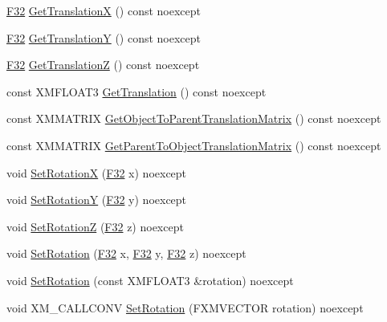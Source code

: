 \begin{DoxyCompactItemize}
\hyperlink{namespacemage_aa97e833b45f06d60a0a9c4fc22ae02c0}{F32} \hyperlink{structmage_1_1_transform_a90b2c059a45964bf4de816a4b7e6c55c}{Get\+TranslationX} () const noexcept
\item 
\hyperlink{namespacemage_aa97e833b45f06d60a0a9c4fc22ae02c0}{F32} \hyperlink{structmage_1_1_transform_a3a806edeeca4db92bdfa4d401ba17cb4}{Get\+TranslationY} () const noexcept
\item 
\hyperlink{namespacemage_aa97e833b45f06d60a0a9c4fc22ae02c0}{F32} \hyperlink{structmage_1_1_transform_a2899159e8e953026bf8b6863c65f454f}{Get\+TranslationZ} () const noexcept
\item 
const X\+M\+F\+L\+O\+A\+T3 \hyperlink{structmage_1_1_transform_af034983b5df429b31a3229270cc0b00b}{Get\+Translation} () const noexcept
\item 
const X\+M\+M\+A\+T\+R\+IX \hyperlink{structmage_1_1_transform_a7f9b6ae60fde68f06e3e57e2180af89c}{Get\+Object\+To\+Parent\+Translation\+Matrix} () const noexcept
\item 
const X\+M\+M\+A\+T\+R\+IX \hyperlink{structmage_1_1_transform_abc1bf609a4fc988ca8299ac4c67e4b25}{Get\+Parent\+To\+Object\+Translation\+Matrix} () const noexcept
\item 
void \hyperlink{structmage_1_1_transform_ac626eec777b86b0a1fc946703c962eda}{Set\+RotationX} (\hyperlink{namespacemage_aa97e833b45f06d60a0a9c4fc22ae02c0}{F32} x) noexcept
\item 
void \hyperlink{structmage_1_1_transform_aaf2754a227e2cf416960a92f7e4c5dc7}{Set\+RotationY} (\hyperlink{namespacemage_aa97e833b45f06d60a0a9c4fc22ae02c0}{F32} y) noexcept
\item 
void \hyperlink{structmage_1_1_transform_aca5e1d7c83e91f9c36be98c4a4a2163b}{Set\+RotationZ} (\hyperlink{namespacemage_aa97e833b45f06d60a0a9c4fc22ae02c0}{F32} z) noexcept
\item 
void \hyperlink{structmage_1_1_transform_ad4c49c5298d68f3945698ba88e461145}{Set\+Rotation} (\hyperlink{namespacemage_aa97e833b45f06d60a0a9c4fc22ae02c0}{F32} x, \hyperlink{namespacemage_aa97e833b45f06d60a0a9c4fc22ae02c0}{F32} y, \hyperlink{namespacemage_aa97e833b45f06d60a0a9c4fc22ae02c0}{F32} z) noexcept
\item 
void \hyperlink{structmage_1_1_transform_a7487b052a7c4ba8d1df7f557669dee51}{Set\+Rotation} (const X\+M\+F\+L\+O\+A\+T3 \&rotation) noexcept
\item 
void X\+M\+\_\+\+C\+A\+L\+L\+C\+O\+NV \hyperlink{structmage_1_1_transform_a66ddc77bfbbf0b66e00d5ec8e10d1d65}{Set\+Rotation} (F\+X\+M\+V\+E\+C\+T\+OR rotation) noexcept

\end{DoxyCompactItemize}
